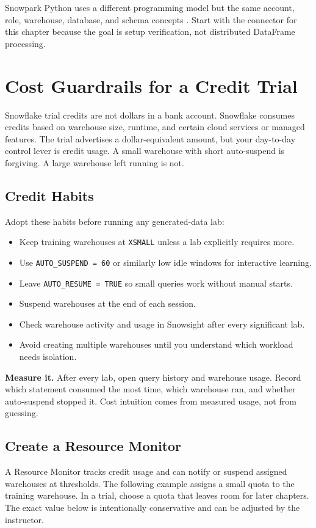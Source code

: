 Snowpark Python uses a different programming model but the same account, role, warehouse, database, and schema concepts \cite{snowflakeSnowparkPythonDocs}. Start with the connector for this chapter because the goal is setup verification, not distributed DataFrame processing.

\section{Cost Guardrails for a Credit Trial}
Snowflake trial credits are not dollars in a bank account. Snowflake consumes credits based on warehouse size, runtime, and certain cloud services or managed features. The trial advertises a dollar-equivalent amount, but your day-to-day control lever is credit usage. A small warehouse with short auto-suspend is forgiving. A large warehouse left running is not.

\subsection{Credit Habits}
Adopt these habits before running any generated-data lab:
\begin{itemize}
    \item Keep training warehouses at \texttt{XSMALL} unless a lab explicitly requires more.
    \item Use \texttt{AUTO\_SUSPEND = 60} or similarly low idle windows for interactive learning.
    \item Leave \texttt{AUTO\_RESUME = TRUE} so small queries work without manual starts.
    \item Suspend warehouses at the end of each session.
    \item Check warehouse activity and usage in Snowsight after every significant lab.
    \item Avoid creating multiple warehouses until you understand which workload needs isolation.
\end{itemize}

\begin{tipbox}
\textbf{Measure it.} After every lab, open query history and warehouse usage. Record which statement consumed the most time, which warehouse ran, and whether auto-suspend stopped it. Cost intuition comes from measured usage, not from guessing.
\end{tipbox}

\subsection{Create a Resource Monitor}
A Resource Monitor tracks credit usage and can notify or suspend assigned warehouses at thresholds. The following example assigns a small quota to the training warehouse. In a trial, choose a quota that leaves room for later chapters. The exact value below is intentionally conservative and can be adjusted by the instructor.

